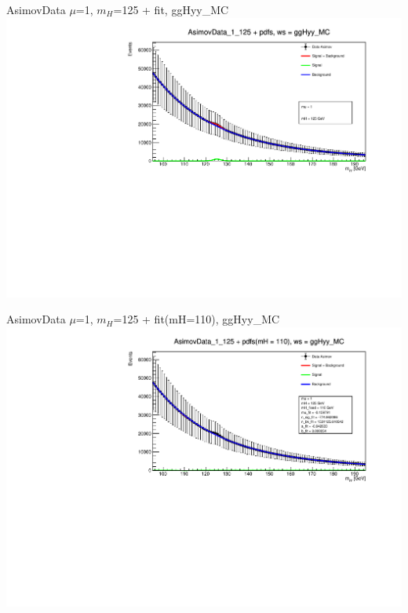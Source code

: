 \documentclass[10pt,UKenglish, leqno, xcolor = dvipsnames]{beamer}
\begin{document}
		\begin{frame}{AsimovData $\mu$=1, $m_H$=125 + fit, ggHyy\_MC}
			\vfill
			\includegraphics[width=1.\textwidth]{../images/AsimovData_1_125_fit_ggHyy_MC.pdf}
			\vfill
		\end{frame}
		
		\begin{frame}{AsimovData $\mu$=1, $m_H$=125 + fit(mH=110), ggHyy\_MC}
			\vfill
			\includegraphics[width=1.\textwidth]{../images/AsimovData_1_125_check_ggHyy_MC.pdf}
			\vfill
		\end{frame}
		
\end{document}
